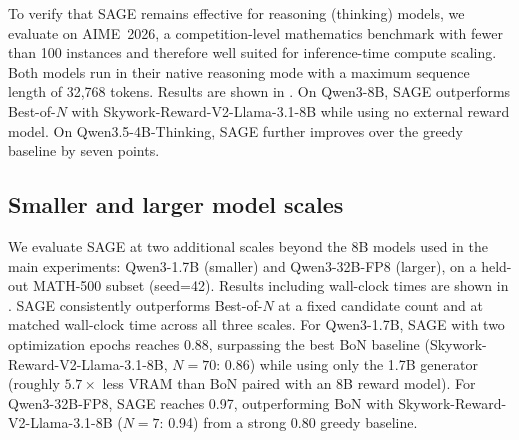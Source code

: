 \documentclass[11pt]{article}
\theoremstyle{plain}
\theoremstyle{definition}
\theoremstyle{remark}
\newcommand{\method}{SAGE}
\begin{document}
To verify that \method{} remains effective for reasoning (thinking) models, we evaluate on AIME~2026, a competition-level mathematics benchmark with fewer than 100 instances and therefore well suited for inference-time compute scaling. Both models run in their native reasoning mode with a maximum sequence length of 32,768 tokens. Results are shown in . On Qwen3-8B, \method{} outperforms Best-of-\(N\) with Skywork-Reward-V2-Llama-3.1-8B \citep{liu2025skywork} while using no external reward model. On Qwen3.5-4B-Thinking, \method{} further improves over the greedy baseline by seven points.


\subsection{Smaller and larger model scales}

We evaluate \method{} at two additional scales beyond the 8B models used in the main experiments: Qwen3-1.7B (smaller) and Qwen3-32B-FP8 (larger), on a held-out MATH-500 subset (seed=42). Results including wall-clock times are shown in . \method{} consistently outperforms Best-of-\(N\) at a fixed candidate count and at matched wall-clock time across all three scales. For Qwen3-1.7B, \method{} with two optimization epochs reaches 0.88, surpassing the best BoN baseline (Skywork-Reward-V2-Llama-3.1-8B, $N=70$: 0.86) while using only the 1.7B generator (roughly $5.7\times$ less VRAM than BoN paired with an 8B reward model). For Qwen3-32B-FP8, \method{} reaches 0.97, outperforming BoN with Skywork-Reward-V2-Llama-3.1-8B ($N=7$: 0.94) from a strong 0.80 greedy baseline.

\end{document}
